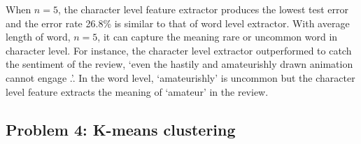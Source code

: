 \documentclass[a4paper]{article}
\begin{document}
\begin{enumerate}[label=\alph*.]
        When $n=5$, the character level feature extractor produces the lowest test error and the error rate 26.8\% is similar to that of word level extractor.
        With average length of word, $n=5$,  it can capture the meaning rare or uncommon word in character level.
        For instance, the character level extractor outperformed to catch the sentiment of the review, `even the hastily and amateurishly drawn animation cannot engage .'.
        In the word level, `amateurishly' is uncommon but the character level feature extracts the meaning of `amateur' in the review.

    \end{enumerate}

\subsection*{Problem 4: K-means clustering}
\end{document}
